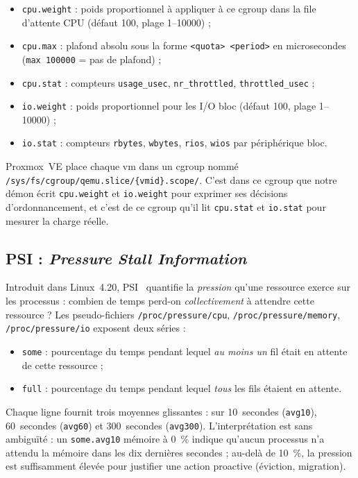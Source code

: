 \begin{itemize}[leftmargin=*]
    \item \texttt{cpu.weight} : poids proportionnel à appliquer à ce cgroup dans la file d'attente CPU (défaut 100, plage 1--10000) ;
    \item \texttt{cpu.max} : plafond absolu sous la forme \texttt{<quota> <period>} en microsecondes (\texttt{max 100000} = pas de plafond) ;
    \item \texttt{cpu.stat} : compteurs \texttt{usage\_usec}, \texttt{nr\_throttled}, \texttt{throttled\_usec} ;
    \item \texttt{io.weight} : poids proportionnel pour les I/O bloc (défaut 100, plage 1--10000) ;
    \item \texttt{io.stat} : compteurs \texttt{rbytes}, \texttt{wbytes}, \texttt{rios}, \texttt{wios} par périphérique bloc.
\end{itemize}

Proxmox~VE place chaque \acrshort{vm} dans un cgroup nommé \mbox{\texttt{/sys/fs/cgroup/qemu.slice/\{vmid\}.scope/}}. C'est dans ce cgroup que notre démon écrit \texttt{cpu.weight} et \texttt{io.weight} pour exprimer ses décisions d'ordonnancement, et c'est de ce cgroup qu'il lit \texttt{cpu.stat} et \texttt{io.stat} pour mesurer la charge réelle.

\subsection{PSI : \emph{Pressure Stall Information}}

Introduit dans Linux~4.20, PSI~\cite{psi_doc} quantifie la \emph{pression} qu'une ressource exerce sur les processus : combien de temps perd-on \emph{collectivement} à attendre cette ressource ? Les pseudo-fichiers \texttt{/proc/pressure/cpu}, \texttt{/proc/pressure/memory}, \texttt{/proc/pressure/io} exposent deux séries :

\begin{itemize}[leftmargin=*]
    \item \texttt{some} : pourcentage du temps pendant lequel \emph{au moins un} fil était en attente de cette ressource ;
    \item \texttt{full} : pourcentage du temps pendant lequel \emph{tous} les fils étaient en attente.
\end{itemize}

Chaque ligne fournit trois moyennes glissantes : sur 10~secondes (\texttt{avg10}), 60~secondes (\texttt{avg60}) et 300~secondes (\texttt{avg300}). L'interprétation est sans ambiguïté : un \texttt{some.avg10} mémoire à 0~\% indique qu'aucun processus n'a attendu la mémoire dans les dix dernières secondes ; au-delà de 10~\%, la pression est suffisamment élevée pour justifier une action proactive (éviction, migration).

